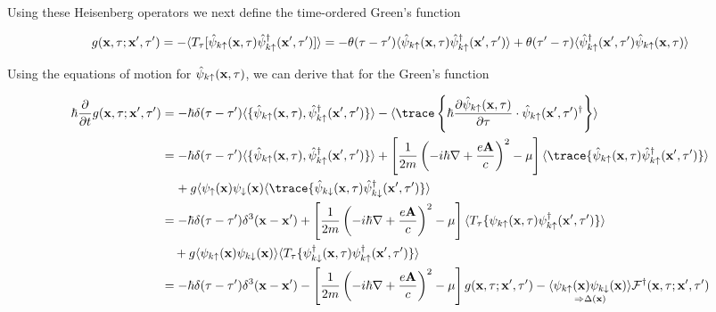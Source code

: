 Using these Heisenberg operators we next define the time-ordered Green's function

\[g({\bf x},\tau;{\bf x}',\tau') = -\langle T_{\tau}[\hat{\psi}_{k\uparrow}({\bf x},\tau)\hat{\psi}^\dagger_{k\uparrow}({\bf x}',\tau')]\rangle = -\theta(\tau-\tau')\langle\hat{\psi}_{k\uparrow}({\bf x},\tau)\hat{\psi}^\dagger_{k\uparrow}({\bf x}',\tau')\rangle + \theta(\tau'-\tau)\langle\hat{\psi}^\dagger_{k\uparrow}({\bf x}',\tau')\hat{\psi}_{k\uparrow}({\bf x},\tau)\rangle\]

Using the equations of motion for $\hat{\psi}_{k\uparrow}({\bf x},\tau)$, we can derive that for the Green's function

\[\begin{split}
\hbar\frac{\partial }{\partial t}g({\bf x},\tau;{\bf x'},\tau') &= -\hbar\delta(\tau-\tau')\langle\{\hat{\psi}_{k\uparrow}({\bf x},\tau),\hat{\psi}^\dagger_{k\uparrow}({\bf x}',\tau')\}\rangle - \langle \trace\left\{\hbar\frac{\partial \hat{\psi}_{k\uparrow}({\bf x},\tau)}{\partial \tau}\cdot\hat{\psi}_{k\uparrow}({\bf x}',\tau')^\dagger\right\}\rangle\\
&=-\hbar\delta(\tau-\tau')\langle\{\hat{\psi}_{k\uparrow}({\bf x},\tau),\hat{\psi}^\dagger_{k\uparrow}({\bf x}',\tau')\}\rangle + \left[\frac{1}{2m}\left(-i\hbar\nabla+\frac{e{\bf A}}{c}\right)^2-\mu\right]\langle\trace\{\hat{\psi}_{k\uparrow}({\bf x},\tau)\hat{\psi}^\dagger_{k\uparrow}({\bf x}',\tau')\}\rangle\\
&\phantom{=\ } + g\langle\psi_\uparrow({\bf x})\psi_{\downarrow}({\bf x})\langle\trace\{\hat{\psi}_{k\downarrow}({\bf x},\tau)\hat{\psi}^\dagger_{k\downarrow}({\bf x}',\tau')\}\rangle\\
&=-\hbar\delta(\tau-\tau')\delta^3({\bf x-x}') + \left[\frac{1}{2m}\left(-i\hbar\nabla+\frac{e{\bf A}}{c}\right)^2-\mu\right]\langle T_\tau \{\psi_{k\uparrow}({\bf x},\tau)\psi^\dagger_{k\uparrow}({\bf x'},\tau')\}\rangle\\
&\quad + g\langle\psi_{k\uparrow}({\bf x})\psi_{k\downarrow}({\bf x})\rangle\langle T_\tau \{\psi^\dagger_{k\downarrow}({\bf x},\tau)\psi^\dagger_{k\uparrow}({\bf x'},\tau')\}\rangle \\
&=-\hbar\delta(\tau-\tau')\delta^3({\bf x-x'}) - \left[\frac{1}{2m}\left(-i\hbar\nabla+\frac{e{\bf A}}{c}\right)^2-\mu\right]g({\bf x},\tau;{\bf x'},\tau') - \underset{\Rightarrow\Delta({\bf x})}{\langle\psi_{k\uparrow}({\bf x})\psi_{k\downarrow}({\bf x})\rangle}\mathcal{F}^\dagger({\bf x},\tau;{\bf x'},\tau')
\end{split}\]

